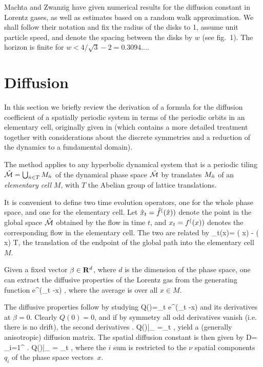 Machta and Zwanzig have given numerical results
for the diffusion constant in Lorentz gases,  as well as
estimates based on a random walk approximation. We shall follow
their notation and fix the radius of the disks to 1,
assume unit particle speed, and
denote the spacing between the disks by $w$ (see fig.~1).
The horizon is finite for $w < 4/\sqrt{3}-2 = 0.3094\dots$.

\section{Diffusion}
In this section we briefly review the
derivation of a formula for the diffusion coefficient
of a spatially periodic system in terms of the periodic orbits in an elementary
cell, originally given in  (which contains
a more detailed treatment together with considerations about the
discrete symmetries and a reduction of the dynamics to a fundamental domain).

The method applies to any  hyperbolic dynamical system that is a periodic
tiling $\hat {{\cal M}}=\bigcup_{ \hat n \in T} M_{\hat n}$ of the dynamical phase space $\hat {{\cal M}}$
by translates $M_{\hat n}$ of an {\sl elementary cell} $M$, with $T$ the
Abelian group of lattice translations.

It is convenient to define two time evolution operators, one
for the whole phase space, and one for the elementary cell.
Let $\hat x_t={\hat{f}^{(}(\hat x)})$ denote the point in
the global space $\hat {{\cal M}}$ obtained by the flow in time $t$,
and $x_t={f^{(}(x)})$ denotes the corresponding flow in
the elementary cell. The two are related by
\beq \hn_t(x)= \hflow ( x) - \flow ( x) \in T\;,\label{hatn} \eeq
the translation of the endpoint of the global path into the elementary cell $M$.

Given a fixed vector $\beta \in {\bf R}^d$, where $d$ is the dimension of the
phase space, one can extract the diffusive properties of the Lorentz gas from
the generating function
\beq \langle e^{\beta \cdot (\hx_t -x) } \rangle\;,\label{generate} \eeq
where the average is over all $x \in M$.

The diffusive properties follow by studying
\beq Q(\beta)=\lim_{t\rightarrow \infty}  \log
    \langle e^{\beta \cdot (\hx_t -x) } \rangle \label{Q} \eeq
and its derivatives at $\beta=0$. Clearly $Q(0)=0$, and if by symmetry all odd
derivatives vanish (i.e. there is no drift), the second derivatives
\beq \left . 
    Q(\beta)\right |_{} =\lim_{t\rightarrow \infty} 
     \rangle\;, \eeq
yield a (generally anisotropic) diffusion matrix.
The spatial diffusion constant is then given by
\beq D= \sum_{i=1}^{\nu} \left .
   Q(\beta)\right |_{} = \lim_{t\rightarrow \infty} 
    \rangle\;, \label{diffus}\eeq
where the $i$ sum is restricted to the $\nu$ spatial components $q_i$ of
the phase space vectors~$x$.

